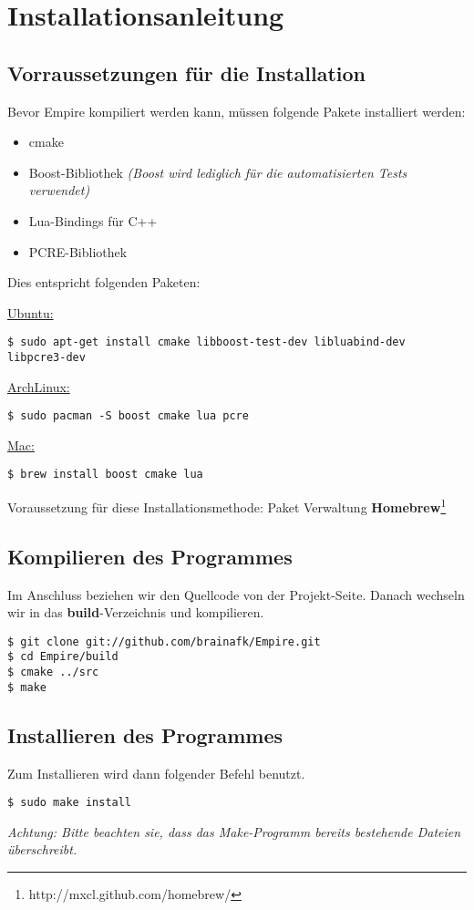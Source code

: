 
\section{Installationsanleitung}

\subsection{Vorraussetzungen für die Installation}
Bevor Empire kompiliert werden kann, müssen folgende Pakete installiert werden:

\begin{itemize}
	\item cmake
	\item Boost-Bibliothek \emph{(Boost wird lediglich für die automatisierten Tests verwendet)}
	\item Lua-Bindings für C++
	\item PCRE-Bibliothek
\end{itemize}

Dies entspricht folgenden Paketen:

\underline{Ubuntu:}
\begin{lstlisting}[style=Bash]
$ sudo apt-get install cmake libboost-test-dev libluabind-dev libpcre3-dev
\end{lstlisting}

\underline{ArchLinux:}
\begin{lstlisting}[style=Bash]
$ sudo pacman -S boost cmake lua pcre
\end{lstlisting}

\underline{Mac:}
\begin{lstlisting}[style=Bash]
$ brew install boost cmake lua
\end{lstlisting}
Voraussetzung für diese Installationsmethode: Paket Verwaltung \textbf{Homebrew}\footnote[1]{http://mxcl.github.com/homebrew/}

\subsection{Kompilieren des Programmes}

Im Anschluss beziehen wir den Quellcode von der Projekt-Seite. Danach wechseln wir in das \textbf{build}-Verzeichnis und kompilieren.

\begin{lstlisting}[style=Bash]
$ git clone git://github.com/brainafk/Empire.git
$ cd Empire/build
$ cmake ../src
$ make
\end{lstlisting}

\subsection{Installieren des Programmes}

Zum Installieren wird dann folgender Befehl benutzt.

\begin{lstlisting}[style=Bash]
$ sudo make install
\end{lstlisting}

\emph{Achtung: Bitte beachten sie, dass das Make-Programm bereits bestehende Dateien überschreibt.}
